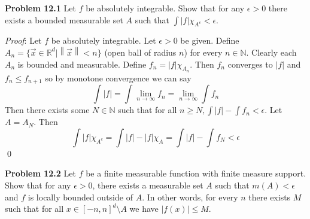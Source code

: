 \documentclass[12pt]{article}
\newcommand{\problem}[1]{\hspace{-4 ex} \large \textbf{Problem #1} }
\newcommand{\norm}[1]{\left\lVert#1\right\rVert}
\renewenvironment{proof}{\hspace{-4 ex} \emph{Proof}:}{\qed}
\begin{document}
\problem{12.1} Let $f$ be absolutely integrable. Show that for any $\epsilon>0$ there exists a bounded measurable set $A$ such that $\int |f|\chi_{A^c}<\epsilon$.

	\begin{proof}
		Let $f$ be absolutely integrable. Let $\epsilon > 0 $ be given. Define $A_n = \{ \vec{x} \in \mathbb{R}^d \vert \norm{\vec{x}} < n \}$ (open ball of radius $n$) for every $n \in \mathbb{N}$. Clearly each $A_n$ is bounded and measurable. Define $f_n = \vert f \vert \chi_{A_n}$. Then $f_n$ converges to $\vert f \vert$ and $f_n \leq f_{n+1}$ so by monotone convergence we can say 
		$$
		\int \vert f \vert = \int \lim_{n \to \infty}{f_n} = \lim_{n \to \infty} \int f_n
		$$
		Then there exists some $N \in \mathbb{N}$ such that for all $n \geq N, \int \vert f \vert - \int f_n < \epsilon$. Let $A = A_N$. Then 
		$$
		\int |f|\chi_{A^c} = \int \vert f \vert - |f|\chi_{A} = \int \vert f \vert - \int f_N < \epsilon 
		$$
	\end{proof}

\problem{12.2} Let $f$ be a finite measurable function with finite measure support. Show that for any $\epsilon>0$, there exists a measurable set $A$ such that $m(A)<\epsilon$ and $f$ is locally bounded outside of $A$. In other words, for every $n$ there exists $M$ such that for all $x\in[-n,n]^d\setminus A$ we have $ \vert f(x) \vert \leq M$.\bigbreak
\end{document}
